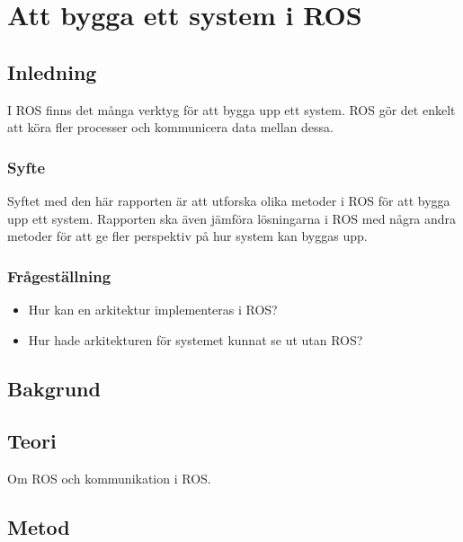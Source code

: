 \chapter{Att bygga ett system i ROS}
\label{cha:indiv-report-lundberg}

\section{Inledning}
\label{sec:introduction-lundberg}

I ROS finns det många verktyg för att bygga upp ett system. ROS gör det enkelt att köra fler processer och kommunicera data mellan dessa.

\subsection{Syfte}
\label{sec:purpose-lundberg}

Syftet med den här rapporten är att utforska olika metoder i ROS för att bygga upp ett system. Rapporten ska även jämföra lösningarna i ROS med några andra metoder för att ge fler perspektiv på hur system kan byggas upp.

\subsection{Frågeställning}
\label{sec:issue-lundberg}

\begin{itemize}
	\item Hur kan en arkitektur implementeras i ROS?
	\item Hur hade arkitekturen för systemet kunnat se ut utan ROS?
\end{itemize}

\section{Bakgrund}
\label{sec:background-lundberg}


\section{Teori}
\label{sec:theory-lundberg}

Om ROS och kommunikation i ROS.

\section{Metod}
\label{sec:method-lundberg}

